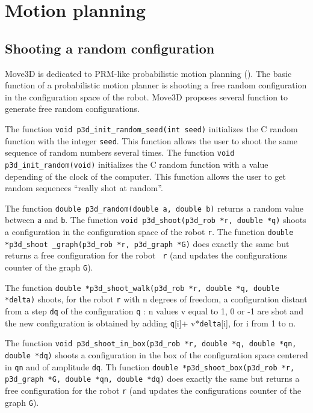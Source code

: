 \chapter{Motion planning}
\label{global}

\section{Shooting a random configuration}

Move3D is dedicated to PRM-like probabilistic motion planning
(\cite{KAVRA95,KSLO96,SVET97}). The basic function of a probabilistic
motion planner is shooting a free random configuration in the configuration
space of the robot. Move3D proposes several function to generate
free random configurations.

The function {\tt void p3d\_init\_random\_seed(int seed)}
 initializes
the C random function with the integer {\tt seed}. This function
allows the user to shoot the same sequence of random numbers several
times. The function {\tt void p3d\_init\_random(void)}
 initializes
the C random function with a value depending of the clock of the
computer. This function allows the user to get random sequences ``really
shot at random''.

The function {\tt double p3d\_random(double a, double b)}
 returns a
random value between {\tt a} and {\tt b}. 
The function {\tt void p3d\_shoot(p3d\_rob *r, double *q)}
 shoots a
configuration in the configuration space of the robot {\tt r}. The
function {\tt double *p3d\_shoot \_graph(p3d\_rob *r, p3d\_graph *G)}
 does
exactly the same but returns a free configuration for the robot {\tt
r} (and updates the configurations counter of the graph {\tt G}).

The function {\tt double *p3d\_shoot\_walk(p3d\_rob *r, double *q,
double *delta)}  shoots, for the robot {\tt r} with n degrees of
freedom, a configuration distant from a step {\tt dq} of the
configuration {\tt q} : n values v equal to 1, 0 or -1 are shot and the
new configuration is obtained by adding {\tt q}[i]+ v*{\tt delta}[i], for
i from 1 to n.

The function {\tt void p3d\_shoot\_in\_box(p3d\_rob *r, double *q,
double *qn, double *dq)}  shoots a configuration in the box of the
configuration space centered in {\tt qn} and of amplitude {\tt dq}. Th
function {\tt double *p3d\_shoot\_box(p3d\_rob *r, p3d\_graph *G,
double *qn, double *dq)}  does exactly the same but returns a free
configuration for the robot {\tt r} (and updates the configurations
counter of the graph {\tt G}).

